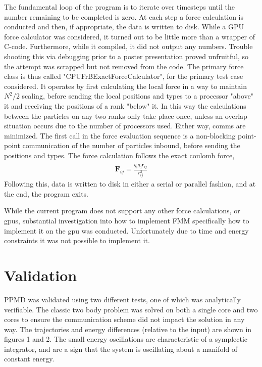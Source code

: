 \documentclass[%
 reprint,
 amsmath,amssymb,
 aps,
pra,
prb,
rmp,
prstab,
prstper,
]{revtex4-1}
\newcommand{\uv}[1]{\hat{\mathbf{#1}}}
\newcommand{\vc}[1]{\mathbf{#1}}
\begin{document}
The fundamental loop of the program is to iterate over timesteps until the number
remaining to be completed is zero. At each step a force calculation is conducted
and then, if appropriate, the data is written to disk. While a GPU force calculator
was considered, it turned out to be little more than a wrapper of C-code. Furthermore,
while it compiled, it did not output any numbers. Trouble shooting this via
debugging prior to a poster presentation proved unfruitful, so the attempt
was scrapped but not removed from the code. The primary force class is thus called
"CPUFrBExactForceCalculator", for the primary test case considered. It operates
by first calculating the local force in a way to maintain $N^{2}/2$ scaling, 
before sending the local positions and types to a processor "above" it and receiving
the positions of a rank "below" it. In this way the calculations between the particles
on any two ranks only take place once, unless an overlap situation occurs due to
the number of processors used. Either way, comms are minimized. The first
call in the force evaluation sequence is a non-blocking point-point communication
of the number of particles inbound, before sending the positions and types. The 
force calculation follows the exact coulomb force, 
\begin{align*}
\vc{F}_{ij} = \frac{q_{i}q_{j}\uv{r}_{ij}}{r_{ij}^{2}}
\end{align*}
Following this, data is written to disk in either a serial or parallel fashion, and
at the end, the program exits. 

While the current program does not support any other force calculations, or gpus, 
substantial investigation into how to implement FMM\cite{kurzak_2006}\cite{challacombe} 
specifically how to implement it on the gpu\cite{lashuk} was conducted. Unfortunately
due to time and energy constraints it was not possible to implement it.


\section{\label{sec:level1}Validation}

PPMD was validated using two different tests, one of which was analytically verifiable.
The classic two body problem was solved on both a single core and two cores to ensure
the communication scheme did not impact the solution in any way. The trajectories and 
energy differences (relative to the input) are shown in figures 1 and 2. The small 
energy oscillations are characteristic of a symplectic integrator, and are a sign
that the system is oscillating about a manifold of constant energy. 
\end{document}
